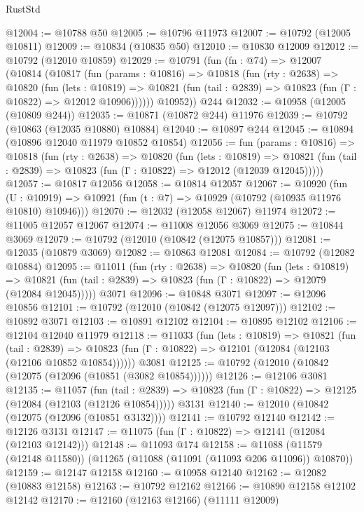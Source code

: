 \begin{lexlean}{RustStd}
\begin{coremodule}
@12004 := @10788 @50
@12005 := @10796 @11973
@12007 := @10792 (@12005 @10811)
@12009 := @10834 (@10835 @50)
@12010 := @10830 @12009
@12012 := @10792 (@12010 @10859)
@12029 := @10791
    (fun (fn : @74) =>
    @12007
      (@10814
        (@10817
          (fun (params : @10816) =>
          @10818
            (fun (rty : @2638) =>
            @10820
              (fun (lets : @10819) =>
              @10821 (fun (tail : @2839) => @10823 (fun (Γ : @10822) => @12012 @10906))))))
        @10952))
    @244
@12032 := @10958 (@12005 (@10809 @244))
@12035 := @10871 (@10872 @244) @11976
@12039 := @10792 (@10863 (@12035 @10880) @10884)
@12040 := @10897 @244
@12045 := @10894 (@10896 @12040 @11979 @10852 @10854)
@12056 := fun (params : @10816) =>
  @10818
    (fun (rty : @2638) =>
    @10820
      (fun (lets : @10819) =>
      @10821 (fun (tail : @2839) => @10823 (fun (Γ : @10822) => @12012 (@12039 @12045)))))
@12057 := @10817 @12056
@12058 := @10814 @12057
@12067 := @10920
    (fun (U : @10919) => @10921 (fun (t : @7) => @10929 (@10792 (@10935 @11976 @10810) @10946)))
@12070 := @12032 (@12058 @12067) @11974
@12072 := @11005 @12057 @12067
@12074 := @11008 @12056 @3069
@12075 := @10844 @3069
@12079 := @10792 (@12010 (@10842 (@12075 @10857)))
@12081 := @12035 (@10879 @3069)
@12082 := @10863 @12081
@12084 := @10792 (@12082 @10884)
@12095 := @11011
    (fun (rty : @2638) =>
    @10820
      (fun (lets : @10819) =>
      @10821 (fun (tail : @2839) => @10823 (fun (Γ : @10822) => @12079 (@12084 @12045)))))
    @3071
@12096 := @10848 @3071
@12097 := @12096 @10856
@12101 := @10792 (@12010 (@10842 (@12075 @12097)))
@12102 := @10892 @3071
@12103 := @10891 @12102
@12104 := @10895 @12102
@12106 := @12104 @12040 @11979
@12118 := @11033
    (fun (lets : @10819) =>
    @10821
      (fun (tail : @2839) =>
      @10823 (fun (Γ : @10822) => @12101 (@12084 (@12103 (@12106 @10852 @10854))))))
    @3081
@12125 := @10792 (@12010 (@10842 (@12075 (@12096 (@10851 (@3082 @10854))))))
@12126 := @12106 @3081
@12135 := @11057
    (fun (tail : @2839) => @10823 (fun (Γ : @10822) => @12125 (@12084 (@12103 (@12126 @10854)))))
    @3131
@12140 := @12010 (@10842 (@12075 (@12096 (@10851 @3132))))
@12141 := @10792 @12140
@12142 := @12126 @3131
@12147 := @11075 (fun (Γ : @10822) => @12141 (@12084 (@12103 @12142)))
@12148 := @11093 @174
@12158 := @11088 (@11579 (@12148 @11580)) (@11265 (@11088 (@11091 (@11093 @206 @11096)) @10870))
@12159 := @12147 @12158
@12160 := @10958 @12140
@12162 := @12082 (@10883 @12158)
@12163 := @10792 @12162
@12166 := @10890 @12158 @12102 @12142
@12170 := @12160 (@12163 @12166) (@11111 @12009)

\end{coremodule}
\end{lexlean}
